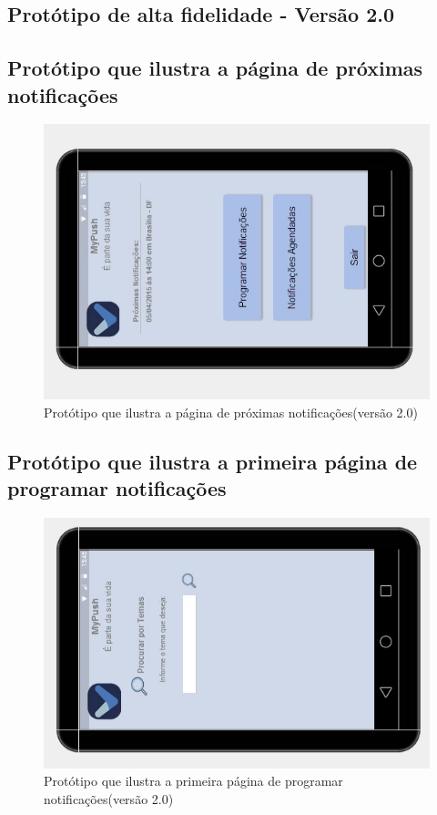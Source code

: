 \begin{apendicesenv}
\chapter{Protótipo de alta fidelidade - Versão 2.0}


    \pagebreak
    \section*{Protótipo que ilustra a página de próximas notificações}

    \begin{figure}[!htbp]
      \centering
      \includegraphics[scale=0.9, angle=-90]{editaveis/figuras/prototipo_alta_fidelidade_v2/2_1}
      \caption{Protótipo que ilustra a página de próximas notificações(versão 2.0)}
      \label{v2}
    \end{figure}
    
    \pagebreak
      \section*{Protótipo que ilustra a primeira página de programar notificações}

    \begin{figure}[!htbp]
      \centering
      \includegraphics[scale=0.9, angle=-90]{editaveis/figuras/prototipo_alta_fidelidade_v2/2_2}
      \caption{Protótipo que ilustra a primeira página de programar notificações(versão 2.0)}
      \label{v2}
    \end{figure}
    

\end{apendicesenv}
